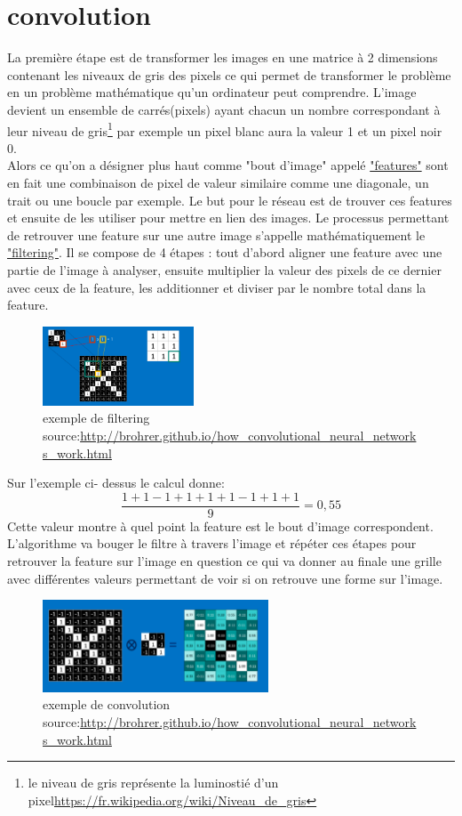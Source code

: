 \documentclass[openany,14pt,fleqn]{book} %
\begin{document}
\section{convolution}
La première étape est de transformer les images en une matrice à 2 dimensions contenant les niveaux de gris des pixels ce qui permet de transformer le problème en un problème mathématique qu'un ordinateur peut comprendre. L'image devient un ensemble de carrés(pixels) ayant chacun un nombre correspondant à leur niveau de gris\footnote{le niveau de gris représente la luminostié d'un pixel\url{https://fr.wikipedia.org/wiki/Niveau_de_gris}} par exemple un pixel blanc aura la valeur 1 et un pixel noir 0.\\
Alors ce qu'on a désigner plus haut comme "bout d'image" appelé \underline{"features"} sont en fait une combinaison de pixel de valeur similaire comme  une diagonale, un trait ou une boucle par exemple. Le but pour le réseau est de trouver ces features et ensuite de les utiliser pour mettre en lien des images. Le processus permettant de retrouver une feature
sur une autre image s'appelle mathématiquement le \underline{"filtering"}. Il se compose de 4 étapes : tout d'abord aligner une feature avec une partie de l'image à analyser, ensuite multiplier la valeur des pixels de ce dernier avec ceux de la feature, les additionner et diviser par le nombre total dans la feature. \\
\begin{figure}[h]
\centering\includegraphics[width=0.4\textwidth]{Pictures/cnn5.png}
\caption{exemple de filtering source:\url{http://brohrer.github.io/how_convolutional_neural_networks_work.html}}
\end{figure}
Sur l'exemple ci- dessus le calcul donne:
\[\frac{1+1-1+1+1+1-1+1+1}{9} = 0,55 \]
Cette valeur montre à quel point la feature est le bout d'image correspondent. L'algorithme va bouger le filtre à travers l'image et répéter ces étapes pour retrouver la feature sur l'image en question ce qui va donner au finale une grille avec différentes valeurs permettant de voir si on retrouve une forme sur l'image.\\
\begin{figure}[h]
\centering\includegraphics[width=0.6\textwidth]{Pictures/cnn6__1_.png}
\caption{exemple de convolution source:\url{http://brohrer.github.io/how_convolutional_neural_networks_work.html}}
\end{figure}
\end{document}
